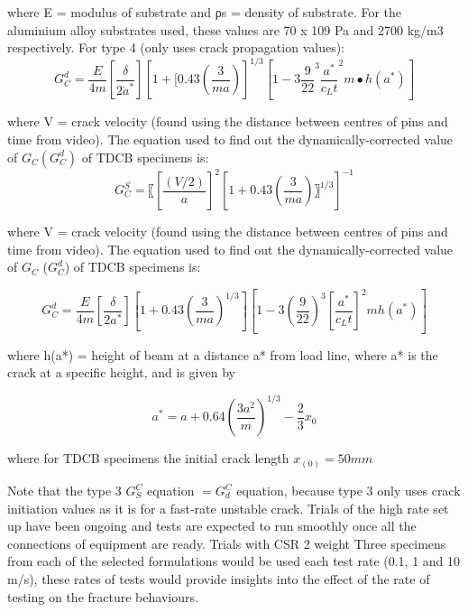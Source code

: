 \documentclass[numbers=noendperiod,chapterprefix=on]{icldt} %
\begin{document}
where E = modulus of substrate and ρs = density of substrate. For the aluminium alloy substrates used, these values are 70 x 109 Pa and 2700 kg/m3 respectively. 
For type 4 (only uses crack propagation values):
\begin{equation} 
G_C^d=  \frac{E}{4m} \left[\frac{\delta}{2\dot{a}^\ast}\right]\left[1+[0.43\left( \frac{3}{ma}\right) \right]^{1/3}\left[1-3\frac{9}{22}^3 {\frac{a^\ast}{c_L t}}^2 m∙h(a^\ast)\right] 
\end{equation}

where V = crack velocity (found using the distance between centres of pins and time from video). The equation used to find out the dynamically-corrected value of $G_C (G^d_C)$ of TDCB specimens is:
\begin{equation} 
G_C^S=〖\left[\frac{(V/2)}{a}\right]^2 \left[1+0.43\left(\frac{3}{ma}\right) 〗^{1/3}\right]^{-1}
\end{equation}

where V = crack velocity (found using the distance between centres of pins and time from video). The equation used to find out the dynamically-corrected value of $G_C$ ($G^d_C$) of TDCB specimens is: 

\begin{equation} 
G_C^d= \frac{E}{4m}  
\left[\frac{\delta}{2a^\ast}\right]
\left[1 +0.43\left( \frac{3}{ma}\right)^{1/3} \right] 
\left[1-3\left( \frac{9}{22}\right) ^3 \left[\frac{a^\ast}{c_L t}\right]^2mh(a^\ast)\right]
\end{equation}

where h(a*) = height of beam at a distance a* from load line, where a* is the crack at a specific height, and is given by

\begin{equation} 
a^\ast=a+0.64 \left( \frac{3a^2}{m}\right) ^{1/3}-\frac{2}{3}x_0
\end{equation}

where for TDCB specimens the initial crack length $x_{(0)}= 50mm$ 

Note that the type 3 $ G_S^C$ equation $ = G_d^C$ equation, because type 3 only uses crack initiation values as it is for a fast-rate unstable crack. 
Trials of the high rate set up have been ongoing and tests are expected to run smoothly once all the connections of equipment are ready. Trials with CSR 2 weight %
Three specimens from each of the selected formulations would be used each test rate (0.1, 1 and 10 m/s), these rates of tests would provide insights into the effect of the rate of testing on the fracture behaviours.
\end{document}
